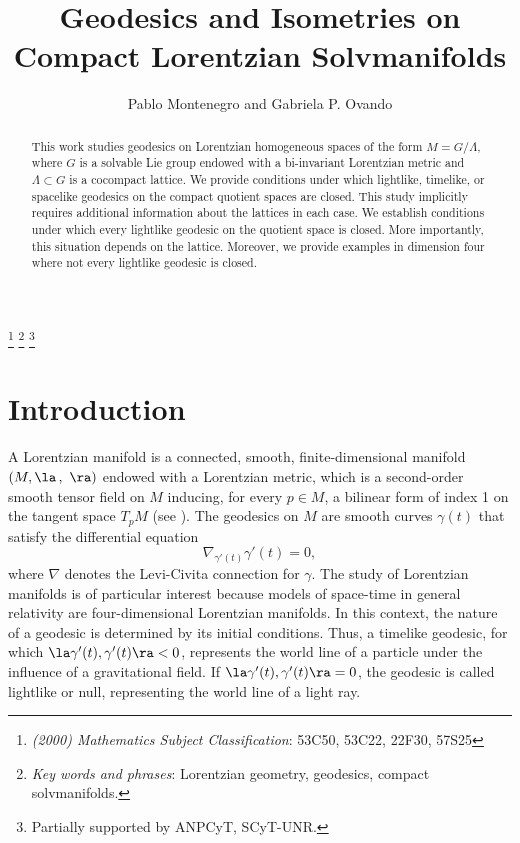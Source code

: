 \documentclass[12pt]{amsart}
\theoremstyle{plain}
\theoremstyle{definition}
\theoremstyle{remark}
\begin{document}
\title[Geodesics and Isometries on Compact Lorentzian Solvmanifolds]{Geodesics and Isometries on Compact Lorentzian Solvmanifolds}

\begin{abstract}
This work studies geodesics on Lorentzian homogeneous spaces of the form $M=G/\Lambda$, where $G$ is a solvable Lie group endowed with a bi-invariant Lorentzian metric and $\Lambda \subset G$ is a cocompact lattice. We provide conditions under which lightlike, timelike, or spacelike geodesics on the compact quotient spaces are closed. This study implicitly requires additional information about the lattices in each case. We establish conditions under which every lightlike geodesic on the quotient space is closed. More importantly, this situation depends on the lattice. Moreover, we provide examples in dimension four where not every lightlike geodesic is closed.
\end{abstract}

\author{Pablo Montenegro and Gabriela P. Ovando}

\let\today\relax
\thanks{{\it (2000) Mathematics Subject Classification}: 53C50, 53C22, 22F30, 57S25}
\thanks{{\it Key words and phrases}: Lorentzian geometry, geodesics, compact solvmanifolds.}
\thanks{Partially supported by ANPCyT, SCyT-UNR.}

\address{Departamento de Matemática, ECEN - FCEIA, Universidad Nacional de Rosario, Pellegrini 250, 2000 Rosario, Santa Fe, Argentina.}

\maketitle

\section{Introduction}
A Lorentzian manifold is a connected, smooth, finite-dimensional manifold $(M, \la \, , \ \ra)$ endowed with a Lorentzian metric, which is a second-order smooth tensor field on $M$ inducing, for every $p\in M$, a bilinear form of index 1 on the tangent space $T_pM$ (see \cite{ON}). The geodesics on $M$ are smooth curves $\gamma(t)$ that satisfy the differential equation
\begin{equation*}
\nabla_{\gamma'(t)}\gamma'(t)=0,
\end{equation*}
where $\nabla$ denotes the Levi-Civita connection for $\gamma$. The study of Lorentzian manifolds is of particular interest because models of space-time in general relativity are four-dimensional Lorentzian manifolds. In this context, the nature of a geodesic is determined by its initial conditions. Thus, a timelike geodesic, for which $\la \gamma'(t), \gamma'(t)\ra < 0$, represents the world line of a particle under the influence of a gravitational field. If $\la \gamma'(t), \gamma'(t)\ra = 0$, the geodesic is called lightlike or null, representing the world line of a light ray.
\end{document}
